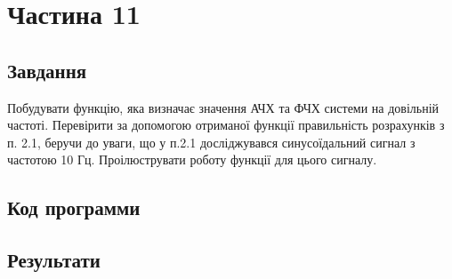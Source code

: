 \section{Частина 11}
\label{sec:task11}

\subsection{Завдання}
\label{subsec:task11_task}

Побудувати функцію, яка визначає значення АЧХ та ФЧХ системи
на довільній частоті. Перевірити за допомогою отриманої функції правильність
розрахунків з п. 2.1, беручи до уваги, що у п.2.1 досліджувався синусоїдальний
сигнал з частотою 10 Гц. Проілюструвати роботу функції для цього сигналу.

\subsection{Код программи}
\label{subsec:task11_code}

\subsection{Результати}
\label{subsec:task11_results}

